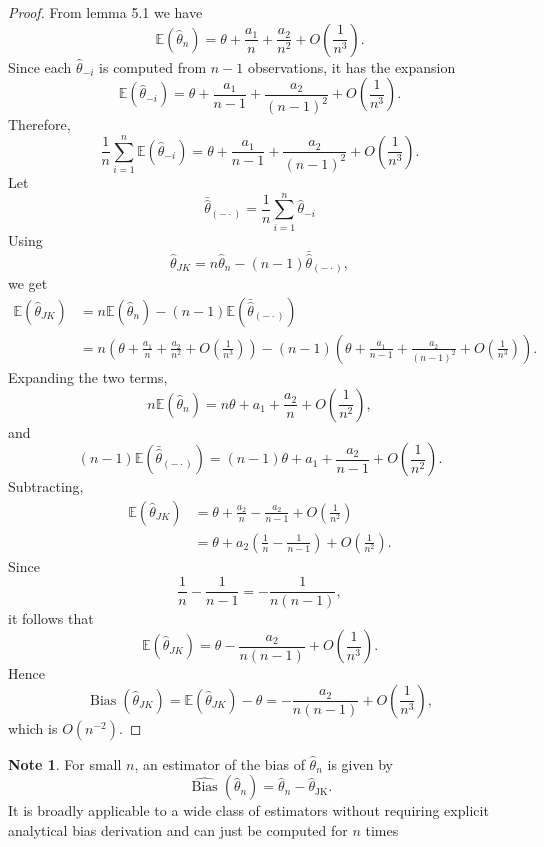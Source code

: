 \documentclass[11pt]{article}
\theoremstyle{definition}
\newtheorem{note}{Note}[section]
\begin{document}
\begin{proof}
From lemma 5.1 we have
\[
\mathbb E(\hat\theta_n)
=
\theta+\frac{a_1}{n}+\frac{a_2}{n^2}+O\!\left(\frac{1}{n^3}\right).
\]
Since each \(\hat\theta_{-i}\) is computed from \(n-1\) observations, it has the expansion
\[
\mathbb E(\hat\theta_{-i})
=
\theta+\frac{a_1}{n-1}+\frac{a_2}{(n-1)^2}+O\!\left(\frac{1}{n^3}\right).
\]
Therefore,
\[
\frac{1}{n}\sum_{i=1}^n \mathbb E(\hat\theta_{-i})
=
\theta+\frac{a_1}{n-1}+\frac{a_2}{(n-1)^2}+O\!\left(\frac{1}{n^3}\right).
\]
Let
\[
\bar{\hat\theta}_{(-\cdot)} = \frac{1}{n}\sum_{i=1}^n \hat\theta_{-i}
\]
Using
\[
\hat\theta_{JK}
=
n\hat\theta_n-(n-1)\bar{\hat\theta}_{(-\cdot)},
\]
we get
\begin{align*}
\mathbb E(\hat\theta_{JK})
&=
n\mathbb E(\hat\theta_n)
-(n-1)\mathbb E\!\left(\bar{\hat\theta}_{(-\cdot)}\right) \\
&=
n\left(\theta+\frac{a_1}{n}+\frac{a_2}{n^2}+O\!\left(\frac{1}{n^3}\right)\right)
-(n-1)\left(\theta+\frac{a_1}{n-1}+\frac{a_2}{(n-1)^2}+O\!\left(\frac{1}{n^3}\right)\right).
\end{align*}
Expanding the two terms,
\[
n\mathbb E(\hat\theta_n)
=
n\theta+a_1+\frac{a_2}{n}+O\!\left(\frac{1}{n^2}\right),
\]
and
\[
(n-1)\mathbb E\!\left(\bar{\hat\theta}_{(-\cdot)}\right)
=
(n-1)\theta+a_1+\frac{a_2}{n-1}+O\!\left(\frac{1}{n^2}\right).
\]
Subtracting,
\begin{align*}
\mathbb E(\hat\theta_{JK})
&=
\theta+\frac{a_2}{n}-\frac{a_2}{n-1}+O\!\left(\frac{1}{n^2}\right) \\
&=
\theta+a_2\left(\frac{1}{n}-\frac{1}{n-1}\right)+O\!\left(\frac{1}{n^2}\right).
\end{align*}
Since
\[
\frac{1}{n}-\frac{1}{n-1}
=
-\frac{1}{n(n-1)},
\]
it follows that
\[
\mathbb E(\hat\theta_{JK})
=
\theta-\frac{a_2}{n(n-1)}+O\!\left(\frac{1}{n^3}\right).
\]
Hence
\[
\operatorname{Bias}(\hat\theta_{JK})
=
\mathbb E(\hat\theta_{JK})-\theta
=
-\frac{a_2}{n(n-1)}+O\!\left(\frac{1}{n^3}\right),
\]
which is \(O(n^{-2})\).
\end{proof}
\begin{note}
For small $n$, an estimator of the bias of $\hat{\theta}_n$ is given by
\[
\widehat{\operatorname{Bias}}(\hat{\theta}_n)
=
\hat{\theta}_n - \hat{\theta}_{\mathrm{JK}}.
\]
It is broadly applicable to a wide class of estimators without requiring explicit analytical bias derivation and can just be computed for $n$ times
\end{note}
\end{document}
